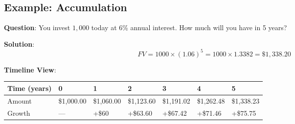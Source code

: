 \documentclass[
  letterpaper,
]{scrbook}
\begin{document}
\subsection{Example: Accumulation}\label{example-accumulation}

\textbf{Question}: You invest \(1,000\) today at 6\% annual interest.
How much will you have in 5 years?

\textbf{Solution}: \[
FV = 1000 \times (1.06)^5 = 1000 \times 1.3382 = \$1,338.20
\]

\textbf{Timeline View}:

\begin{longtable}[]{@{}
  >{\raggedright\arraybackslash}p{}
  >{\raggedright\arraybackslash}p{}
  >{\raggedright\arraybackslash}p{}
  >{\raggedright\arraybackslash}p{}
  >{\raggedright\arraybackslash}p{}
  >{\raggedright\arraybackslash}p{}
  >{\raggedright\arraybackslash}p{}@{}}
\toprule\noalign{}
\begin{minipage}[b]{\linewidth}\raggedright
Time (years)
\end{minipage} & \begin{minipage}[b]{\linewidth}\raggedright
0
\end{minipage} & \begin{minipage}[b]{\linewidth}\raggedright
1
\end{minipage} & \begin{minipage}[b]{\linewidth}\raggedright
2
\end{minipage} & \begin{minipage}[b]{\linewidth}\raggedright
3
\end{minipage} & \begin{minipage}[b]{\linewidth}\raggedright
4
\end{minipage} & \begin{minipage}[b]{\linewidth}\raggedright
5
\end{minipage} \\
\midrule\noalign{}
\endhead
\bottomrule\noalign{}
\endlastfoot
Amount & \$1,000.00 & \$1,060.00 & \$1,123.60 & \$1,191.02 & \$1,262.48
& \$1,338.23 \\
Growth & --- & +\$60 & +\$63.60 & +\$67.42 & +\$71.46 & +\$75.75 \\
\end{longtable}
\end{document}
